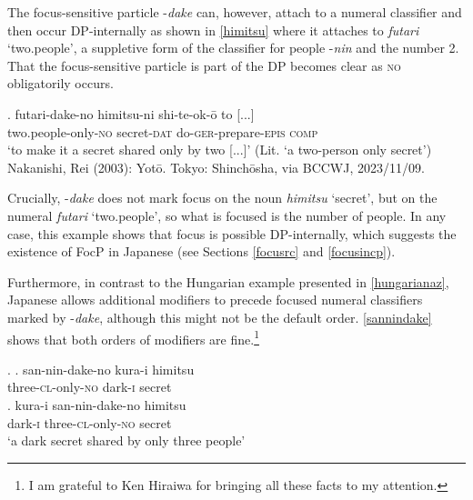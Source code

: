 The focus-sensitive particle -\textit{dake} can, however, attach to a numeral classifier and then occur DP-internally as shown in \ref{himitsu} where it attaches to \textit{futari} `two.people’, a suppletive form of the classifier for people -\textit{nin} and the number 2. That the focus-sensitive particle is part of the DP becomes clear as \textsc{no} obligatorily occurs.

\exg. futari-dake-no himitsu-ni shi-te-ok-ō to [...]\\
two.people-only-\textsc{no} secret-\textsc{dat} do-\textsc{ger}-prepare-\textsc{epis} \textsc{comp}\\
`to make it a secret shared only by two [...]’ (Lit. `a two-person only secret’) \\ Nakanishi, Rei (2003): Yotō. Tokyo: Shinchōsha, via BCCWJ, 2023/11/09. \label{himitsu}

Crucially, -\textit{dake} does not mark focus on the noun \textit{himitsu} `secret’, but on the numeral \textit{futari} `two.people’, so what is focused is the number of people. In any case, this example shows that focus is possible DP-internally, which suggests the existence of FocP in Japanese (see Sections \ref{focusrc} and \ref{focusincp}).

Furthermore, in contrast to the Hungarian example presented in \ref{hungarianaz}, Japanese allows additional modifiers to precede focused numeral classifiers marked by -\textit{dake}, although this might not be the default order. \ref{sannindake} shows that both orders of modifiers are fine.\footnote{I am grateful to Ken Hiraiwa for bringing all these facts to my attention.}

\ex. \label{sannindake} \ag. san-nin-dake-no kura-i himitsu\\
three-\textsc{cl}-only-\textsc{no} dark-\textsc{i} secret\\
\bg. kura-i san-nin-dake-no himitsu\\
dark-\textsc{i} three-\textsc{cl}-only-\textsc{no} secret\\
`a dark secret shared by only three people’

